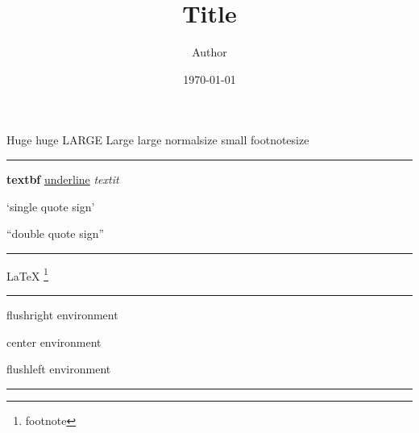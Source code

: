 \documentclass{article}
\title{Title}
\author{Author}
\date{\today}
\begin{document}
\maketitle


{\Huge Huge} {\huge huge} {\LARGE LARGE} {\Large Large} {\large large} {\normalsize normalsize} {\small small} {\footnotesize footnotesize}

\noindent\rule{\linewidth}{0.4pt}



\textbf{textbf} \underline{underline} \textit{textit}

`single quote sign'

``double quote sign''

\noindent\rule{\linewidth}{0.4pt}



{\LaTeX} \footnote{footnote}

\noindent\rule{\linewidth}{0.4pt}



\begin{flushright}
    flushright environment
\end{flushright}

\begin{center}
    center environment
\end{center}

\begin{flushleft}
    flushleft environment
\end{flushleft}

\noindent\rule{\linewidth}{0.4pt}
\end{document}
